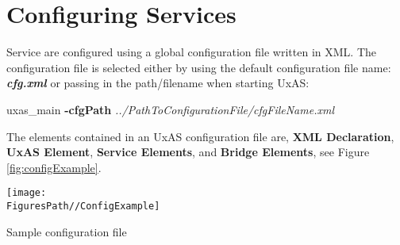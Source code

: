 \section{Configuring Services}
Service are configured using a global configuration file written in XML. The configuration file is selected either  by using the default configuration file name: \textbf{\textit{cfg.xml}} or passing in the path/filename when starting UxAS:
\begin{docspec}
	uxas\_main \textbf{-cfgPath} \textit{../PathToConfigurationFile/cfgFileName.xml}
\end{docspec} 
The elements contained in an UxAS configuration file are, \textbf{XML Declaration}, \textbf{UxAS Element}, \textbf{Service Elements}, and \textbf{Bridge Elements}, see Figure \ref{fig:configExample}. 
\begin{marginfigure}[-100pt]
	\texttt{[image: \\FiguresPath//ConfigExample]}
	\caption{Sample configuration file}
	\label{fig:configExample}
\end{marginfigure}

